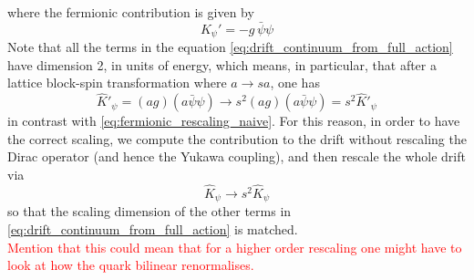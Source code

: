 where the fermionic contribution is given by
\begin{equation*}
    K_{\psi}' = - g \, \bar\psi\psi
\end{equation*}
Note that all the terms in the equation \eqref{eq:drift_continuum_from_full_action} have dimension 2, in units of energy, which means, in particular, that after a lattice block-spin transformation where $a \to sa$, one has
\begin{equation}
    \widehat{K}'_\psi = (ag) (a\bar\psi \psi) \to s^2 (ag) (a\bar\psi \psi) = s^2 \widehat{K}'_\psi
    \label{eq:rescaling_blinear}
\end{equation}
in contrast with \eqref{eq:fermionic_rescaling_naive}. For this reason, in order to have the correct scaling, we compute the contribution to the drift without rescaling the Dirac operator (and hence the Yukawa coupling), and then rescale the whole drift via 
\begin{equation*}
    \widehat{K}_\psi \to s^2 \widehat{K}_\psi
\end{equation*}
so that the scaling dimension of the other terms in \eqref{eq:drift_continuum_from_full_action} is matched. \\
\textcolor{red}{Mention that this could mean that for a higher order rescaling one might have to look at how the quark bilinear renormalises.}

\newpage 